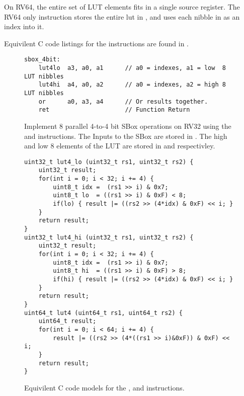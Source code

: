 On RV64, the entire set of LUT elements fits in a single source register.
The RV64 only  instruction stores the entire lut in
\rstwo, and uses each nibble in \rsone as an index into it.

Equivilent C code listings for the instructions are found in
.


\begin{figure}
\begin{lstlisting}[style=ASM]
sbox_4bit:
    lut4lo  a3, a0, a1      // a0 = indexes, a1 = low  8 LUT nibbles
    lut4hi  a4, a0, a2      // a0 = indexes, a2 = high 8 LUT nibbles
    or      a0, a3, a4      // Or results together.
    ret                     // Function Return
\end{lstlisting}
\caption{
    Implement 8 parallel 4-to-4 bit SBox operations on RV32 using
    the  and  instructions.
    The Inputs to the SBox are stored in .
    The high and low $8$ elements of the
    LUT are stored in  and  respectivley.
}
\label{fig:example:lut4:1}
\end{figure}

\begin{figure}
\begin{lstlisting}[style=C]
uint32_t lut4_lo (uint32_t rs1, uint32_t rs2) {
    uint32_t result;
    for(int i = 0; i < 32; i += 4) {
        uint8_t idx =  (rs1 >> i) & 0x7;
        uint8_t lo  = ((rs1 >> i) & 0xF) < 8;
        if(lo) { result |= ((rs2 >> (4*idx) & 0xF) << i; }
    }
    return result;
}
uint32_t lut4_hi (uint32_t rs1, uint32_t rs2) {
    uint32_t result;
    for(int i = 0; i < 32; i += 4) {
        uint8_t idx =  (rs1 >> i) & 0x7;
        uint8_t hi  = ((rs1 >> i) & 0xF) > 8;
        if(hi) { result |= ((rs2 >> (4*idx) & 0xF) << i; }
    }
    return result;
}
uint64_t lut4 (uint64_t rs1, uint64_t rs2) {
    uint64_t result;
    for(int i = 0; i < 64; i += 4) {
        result |= ((rs2 >> (4*((rs1 >> i)&0xF)) & 0xF) << i;
    }
    return result;
}
\end{lstlisting}
\caption{
    Equivilent C code models for the
    ,  and 
    instructions.
}
\label{fig:equiv:c:lut4}
\end{figure}

